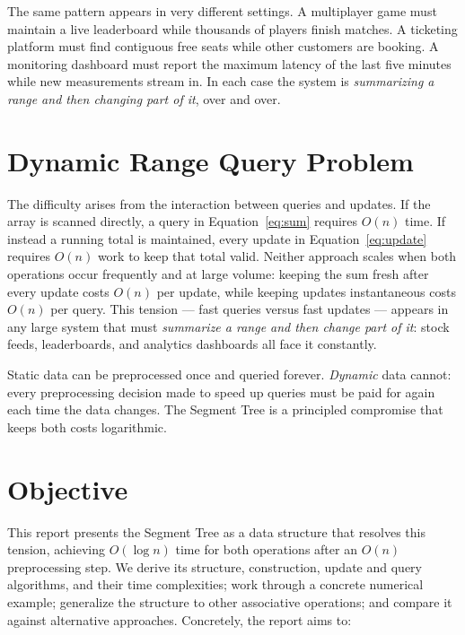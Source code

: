 \documentclass[
  11pt,
  a4paper,
  twoside=false,
  numbers=noenddot,
  headings=big,
  parskip=half,
  toc=bibliography,
  toc=listof,
  bibliography=totoc
]{scrreprt}
\newcounter{example}[chapter]
\begin{document}
The same pattern appears in very different settings. A multiplayer game must maintain a live leaderboard while thousands of players finish matches. A ticketing platform must find contiguous free seats while other customers are booking. A monitoring dashboard must report the maximum latency of the last five minutes while new measurements stream in. In each case the system is \emph{summarizing a range and then changing part of it}, over and over.

\section{Dynamic Range Query Problem}
The difficulty arises from the interaction between queries and updates. If the array is scanned directly, a query in Equation~\eqref{eq:sum} requires $O(n)$ time. If instead a running total is maintained, every update in Equation~\eqref{eq:update} requires $O(n)$ work to keep that total valid. Neither approach scales when both operations occur frequently and at large volume: keeping the sum fresh after every update costs $O(n)$ per update, while keeping updates instantaneous costs $O(n)$ per query. This tension --- fast queries versus fast updates --- appears in any large system that must \emph{summarize a range and then change part of it}: stock feeds, leaderboards, and analytics dashboards all face it constantly.

\begin{keyidea}
Static data can be preprocessed once and queried forever. \emph{Dynamic} data cannot: every preprocessing decision made to speed up queries must be paid for again each time the data changes. The Segment Tree is a principled compromise that keeps both costs logarithmic.
\end{keyidea}

\section{Objective}
This report presents the Segment Tree as a data structure that resolves this tension, achieving $O(\log n)$ time for both operations after an $O(n)$ preprocessing step. We derive its structure, construction, update and query algorithms, and their time complexities; work through a concrete numerical example; generalize the structure to other associative operations; and compare it against alternative approaches. Concretely, the report aims to:
\end{document}

